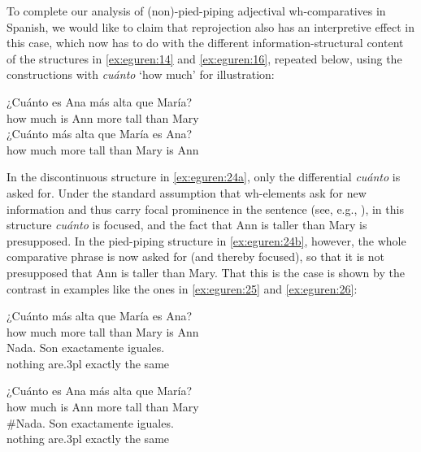 \documentclass[output=paper,colorlinks,citecolor=brown]{langscibook}
\begin{document}
To complete our analysis of (non)-pied-piping adjectival wh-comparatives in Spanish, we would like to claim that reprojection also has an interpretive effect in this case, which now has to do with the different information-structural content of the structures in \ref{ex:eguren:14} and \ref{ex:eguren:16}, repeated below, using the constructions with \textit{cuánto} `how much' for illustration: 

\begin{exe} 
    \ex\label{ex:eguren:24} 
    \begin{xlist}
            \ex\label{ex:eguren:24a}
\gll ¿Cuánto es	Ana más		alta	que	María?\\
     {how much}		is	Ann more	tall	than	Mary\\
            \ex\label{ex:eguren:24b}
\gll ¿Cuánto más	alta	que	María	es	Ana?\\
   {how much}		more	tall	than	Mary		is	Ann\\
\end{xlist}
\end{exe}

In the discontinuous structure in \ref{ex:eguren:24a}, only the differential \textit{cuánto} is asked for. Under the standard assumption that wh-elements ask for new information and thus carry focal prominence in the sentence (see, e.g., \citeauthor{rizzi1997fine} \citeyear{rizzi1997fine}), in this structure \textit{cuánto} is focused, and the fact that Ann is taller than Mary is presupposed. In the pied-piping structure in \ref{ex:eguren:24b}, however, the whole comparative phrase is now asked for (and thereby focused), so that it is not presupposed that Ann is taller than Mary. That this is the case is shown by the contrast in examples like the ones in \ref{ex:eguren:25} and \ref{ex:eguren:26}: 

\begin{exe} 
    \ex\label{ex:eguren:25} 
    \begin{xlist}
            \ex
\gll¿Cuánto			más	alta	que	María	es	Ana?\\
     {how much}		more	tall	than	Mary		is	Ann\\
            \ex
\gll Nada.	Son		exactamente	iguales.\\
  nothing	are.3pl	exactly	{the same}\\
\end{xlist}
\end{exe}

\begin{exe} 
    \ex\label{ex:eguren:26} 
    \begin{xlist}
            \ex
\gll ¿Cuánto es	Ana más		alta	que	María?\\
     {how much}	is	Ann more	tall	than	Mary\\
            \ex
\gll \#Nada.		Son		exactamente	iguales.\\
 nothing	are.3pl	exactly	{the same}\\
\end{xlist}
\end{exe}
\end{document}
